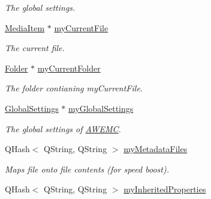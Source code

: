 \begin{DoxyCompactItemize}
\begin{DoxyCompactList}\small\item\em The global settings. \end{DoxyCompactList}\item 
\hypertarget{class_a_w_e_1_1_j_s_o_n_scraper_a9672341060610ef66334d232f1319149}{\hyperlink{class_a_w_e_1_1_media_item}{Media\-Item} $\ast$ \hyperlink{class_a_w_e_1_1_j_s_o_n_scraper_a9672341060610ef66334d232f1319149}{my\-Current\-File}}\label{class_a_w_e_1_1_j_s_o_n_scraper_a9672341060610ef66334d232f1319149}

\begin{DoxyCompactList}\small\item\em The current file. \end{DoxyCompactList}\item 
\hypertarget{class_a_w_e_1_1_j_s_o_n_scraper_a00f08f99c83dbeadd7fdf44d6677ff47}{\hyperlink{class_a_w_e_1_1_folder}{Folder} $\ast$ \hyperlink{class_a_w_e_1_1_j_s_o_n_scraper_a00f08f99c83dbeadd7fdf44d6677ff47}{my\-Current\-Folder}}\label{class_a_w_e_1_1_j_s_o_n_scraper_a00f08f99c83dbeadd7fdf44d6677ff47}

\begin{DoxyCompactList}\small\item\em The folder contianing my\-Current\-File. \end{DoxyCompactList}\item 
\hypertarget{class_a_w_e_1_1_j_s_o_n_scraper_a91f5819597613553161fe9bf22581c31}{\hyperlink{class_a_w_e_1_1_global_settings}{Global\-Settings} $\ast$ \hyperlink{class_a_w_e_1_1_j_s_o_n_scraper_a91f5819597613553161fe9bf22581c31}{my\-Global\-Settings}}\label{class_a_w_e_1_1_j_s_o_n_scraper_a91f5819597613553161fe9bf22581c31}

\begin{DoxyCompactList}\small\item\em The global settings of \hyperlink{class_a_w_e_1_1_a_w_e_m_c}{A\-W\-E\-M\-C}. \end{DoxyCompactList}\item 
\hypertarget{class_a_w_e_1_1_j_s_o_n_scraper_a17088ef91b31db71172616f62b2d257c}{Q\-Hash$<$ Q\-String, Q\-String $>$ \hyperlink{class_a_w_e_1_1_j_s_o_n_scraper_a17088ef91b31db71172616f62b2d257c}{my\-Metadata\-Files}}\label{class_a_w_e_1_1_j_s_o_n_scraper_a17088ef91b31db71172616f62b2d257c}

\begin{DoxyCompactList}\small\item\em Maps file onto file contents (for speed boost). \end{DoxyCompactList}\item 
\hypertarget{class_a_w_e_1_1_j_s_o_n_scraper_ade471d4c08caf575269396b9321278ab}{Q\-Hash$<$ Q\-String, Q\-String $>$ \hyperlink{class_a_w_e_1_1_j_s_o_n_scraper_ade471d4c08caf575269396b9321278ab}{my\-Inherited\-Properties}}\label{class_a_w_e_1_1_j_s_o_n_scraper_ade471d4c08caf575269396b9321278ab}


\end{DoxyCompactItemize}

